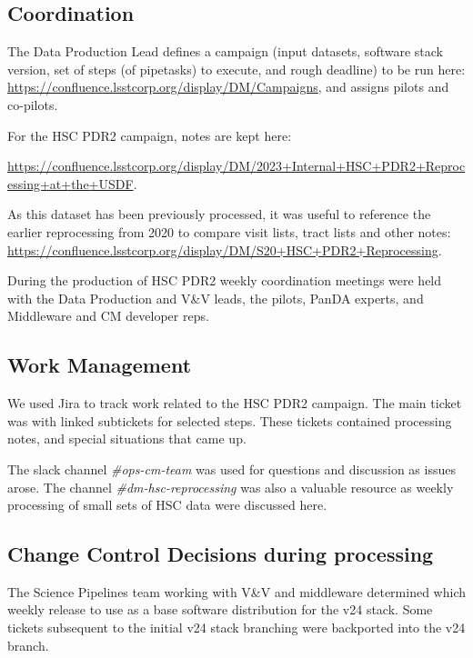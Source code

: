 \subsection{Coordination}

The Data Production Lead defines a campaign (input datasets, 
software stack version, set of steps (of pipetasks) to execute, and 
rough deadline) to be run 
here: \url{https://confluence.lsstcorp.org/display/DM/Campaigns}, and assigns pilots and co-pilots.

For the HSC PDR2 campaign, notes are kept here: 

\url{https://confluence.lsstcorp.org/display/DM/2023+Internal+HSC+PDR2+Reprocessing+at+the+USDF}.   

As this dataset has been previously processed, it was useful
to reference the earlier reprocessing from 2020 to compare visit lists, tract lists and other notes:
\url{https://confluence.lsstcorp.org/display/DM/S20+HSC+PDR2+Reprocessing}.

During the production of HSC PDR2 weekly coordination meetings were held with the Data Production and V\&V leads, the pilots, PanDA experts, 
and Middleware and CM developer reps. 

\subsection{Work Management}

We used Jira to track work related to the HSC PDR2 campaign.
The main ticket was  with linked subtickets for selected steps.
These tickets contained processing notes, and special situations that came up.

The slack channel {\it\#ops-cm-team} was used for questions and discussion as issues arose.
The channel {\it\#dm-hsc-reprocessing} was also a valuable resource as 
weekly processing of small sets of HSC data were discussed here.

\subsection{Change Control Decisions during processing}

The Science Pipelines team working with V\&V and middleware determined which weekly release to use as a base
software distribution for the v24 stack.  Some tickets subsequent to the initial v24 stack branching
were backported into the v24 branch.  

